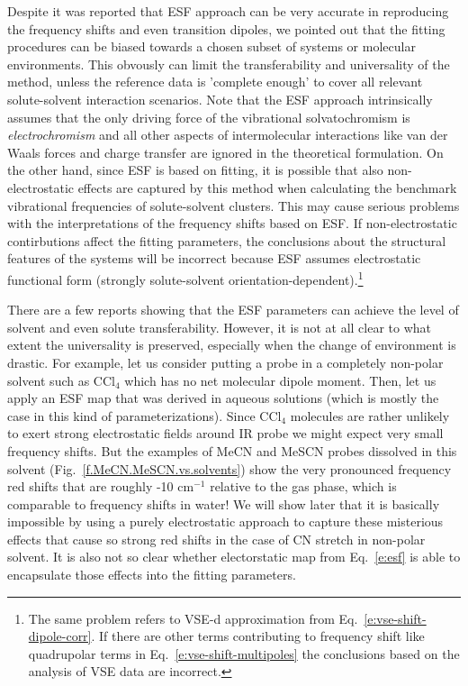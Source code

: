 \documentclass[a4paper,titlepage,twoside,fleqn,12pt]{book}
\begin{document}
\begin{refsection}
Despite it was reported that ESF approach can be very accurate in reproducing the frequency shifts and even
transition dipoles, we pointed out that the fitting procedures
can be biased towards a chosen subset of systems or molecular environments. This obvously can limit
the transferability and universality of the method, unless the reference data is 'complete enough'
to cover all relevant solute-solvent interaction scenarios. Note that the ESF approach intrinsically
assumes that the only driving force of the vibrational solvatochromism is \emph{electrochromism}
and all other aspects of intermolecular interactions like van der Waals forces and charge transfer are
ignored in the theoretical formulation. On the other hand, since ESF is based on fitting, it is 
possible that also non\hyp{}electrostatic effects are captured by this method when calculating the benchmark 
vibrational frequencies of solute-solvent clusters. This may cause serious problems with the interpretations
of the frequency shifts based on ESF. If non\hyp{}electrostatic contirbutions affect the fitting
parameters, the conclusions about the structural features of the systems will be incorrect 
because ESF assumes electrostatic functional form (strongly solute-solvent orientation-dependent).\footnote{
The same problem refers to VSE-d approximation from Eq.~\eqref{e:vse-shift-dipole-corr}.
If there are other terms contributing to frequency shift like quadrupolar terms 
in Eq.~\eqref{e:vse-shift-multipoles} the conclusions based
on the analysis of VSE data are incorrect.}

There are a few reports showing that the ESF parameters can achieve the level of solvent
and even solute transferability. However, it is not at all clear to what extent the universality is
preserved, especially when the change of environment is drastic. For example, let us consider putting a probe in
a completely non-polar solvent such as CCl$_4$ which has no net molecular dipole moment. 
Then, let us apply an ESF map that was derived in aqueous solutions (which is mostly the case in this kind
of parameterizations). Since CCl$_4$ molecules are rather unlikely to exert strong electrostatic fields 
around IR probe we might expect very small frequency shifts. But the examples of MeCN and MeSCN probes
dissolved in this solvent (Fig.~\ref{f.MeCN.MeSCN.vs.solvents}) show the very pronounced frequency red shifts that are roughly -10 cm$^{-1}$
relative to the gas phase, which is comparable to frequency shifts in water! 
We will show later that it is basically impossible by using a purely electrostatic approach
to capture these misterious effects that cause so strong red shifts in the case of CN stretch in non-polar
solvent. It is also not so clear whether electorstatic map from Eq.~\eqref{e:esf} is able to 
encapsulate those effects into the fitting parameters.


\end{refsection}
\end{document}
